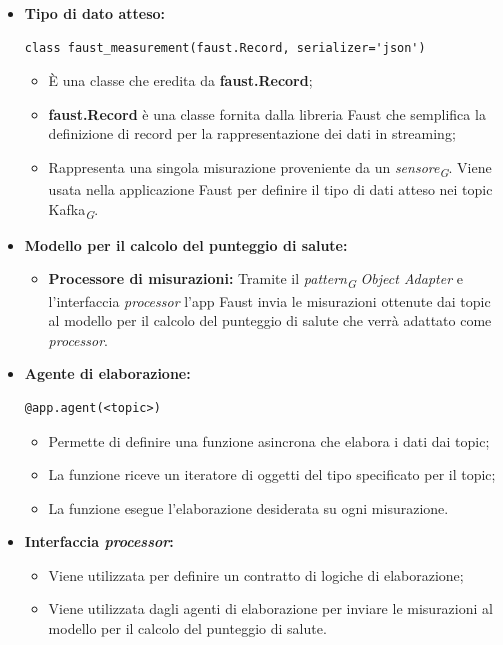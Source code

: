 \begin{itemize}
    \item \textbf{Tipo di dato atteso:}
     \begin{lstlisting}[style=code]
    class faust_measurement(faust.Record, serializer='json')
    \end{lstlisting}  
    \begin{itemize}
        \item È una classe che eredita da \textbf{faust.Record};
        \item \textbf{faust.Record} è una classe fornita dalla libreria Faust che semplifica la definizione di record per la rappresentazione dei dati in streaming;
        \item Rappresenta una singola misurazione proveniente da un \textit{sensore}\textsubscript{\textit{G}}. Viene usata nella applicazione Faust per definire il tipo di dati atteso nei topic Kafka\textsubscript{\textit{G}}.
    \end{itemize}

    \item \textbf{Modello per il calcolo del punteggio di salute:}
    \begin{itemize}
        \item \textbf{Processore di misurazioni:}
        Tramite il \textit{pattern}\textsubscript{\textit{G}} \textit{Object Adapter} e l'interfaccia \textit{processor} l'app Faust invia le misurazioni ottenute dai topic al modello per il calcolo del punteggio di salute che verrà adattato come \textit{processor}.
    \end{itemize}

    \item \textbf{Agente di elaborazione:} 
    \begin{lstlisting}[style=code]
    @app.agent(<topic>)
    \end{lstlisting}  
    \begin{itemize}
        \item Permette di definire una funzione asincrona che elabora i dati dai topic;
        \item La funzione riceve un iteratore di oggetti del tipo specificato per il topic;
        \item La funzione esegue l'elaborazione desiderata su ogni misurazione.
    \end{itemize}

    \item \textbf{Interfaccia \textit{processor}:}
    \begin{itemize}
        \item Viene utilizzata per definire un contratto di logiche di elaborazione;
        \item Viene utilizzata dagli agenti di elaborazione per inviare le misurazioni al modello per il calcolo del punteggio di salute.
    \end{itemize}


\end{itemize}
